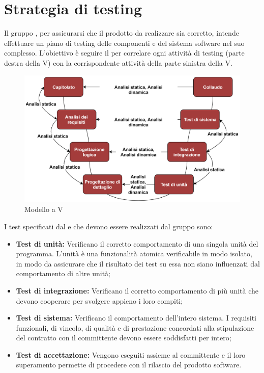 \section{Strategia di testing}
Il gruppo \Gruppo{}, per assicurarsi che il prodotto da realizzare sia corretto, intende effettuare un piano di testing delle componenti e del sistema software nel suo complesso.
L'obiettivo è seguire il  per correlare ogni attività di testing (parte destra della V) con la corrispondente attività della parte sinistra della V.

\begin{figure}[h]
    \centering
    \includegraphics[scale=0.85]{Sezioni/Immagini/ModelloV.png}
    \caption{Modello a V}
\end{figure}

I test specificati dal  e che devono essere realizzati dal gruppo sono:
\begin{itemize}
    \item \textbf{Test di unità:} Verificano il corretto comportamento di una singola unità del programma. L'unità è una funzionalità atomica verificabile in modo isolato, in modo da assicurare che il risultato dei test su essa non siano influenzati dal comportamento di altre unità; 
    \item \textbf{Test di integrazione:} Verificano il corretto comportamento di più unità che devono cooperare per svolgere appieno i loro compiti;
    \item \textbf{Test di sistema:} Verificano il comportamento dell'intero sistema. I requisiti funzionali, di vincolo, di qualità e di prestazione concordati alla stipulazione del contratto con il committente devono essere soddisfatti per intero;
    \item \textbf{Test di accettazione:} Vengono eseguiti assieme al committente e il loro superamento permette di procedere con il rilascio del prodotto software.
\end{itemize}


